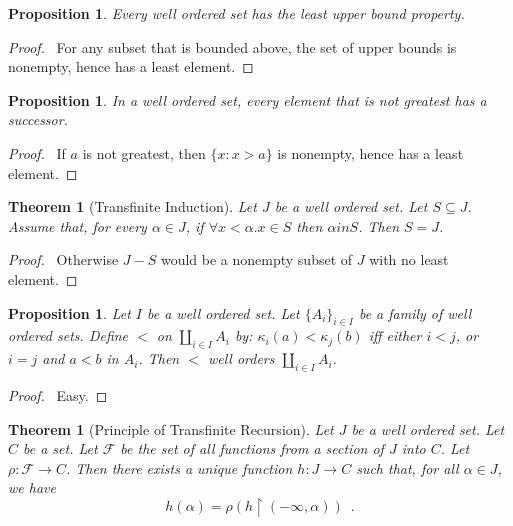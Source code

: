 \documentclass{book}
\let\qed\relax
\newtheorem{prop}[ax]{Proposition}
\newtheorem{thm}[ax]{Theorem}
\theoremstyle{definition}
\begin{document}
\begin{prop}
Every well ordered set has the least upper bound property.
\end{prop}

\begin{proof}
\pf\ For any subset that is bounded above, the set of upper bounds is nonempty, hence has a least element. \qed
\end{proof}

\begin{prop}
In a well ordered set, every element that is not greatest has a successor.
\end{prop}

\begin{proof}
\pf\ If $a$ is not greatest, then $\{ x : x > a \}$ is nonempty, hence has a least element. \qed
\end{proof}

\begin{thm}[Transfinite Induction]
Let $J$ be a well ordered set. Let $S \subseteq J$. Assume that, for every $\alpha \in J$, if $\forall x < \alpha. x \in S$ then $\alpha in S$. Then $S = J$.
\end{thm}

\begin{proof}
\pf\ Otherwise $J - S$ would be a nonempty subset of $J$ with no least element. \qed
\end{proof}

\begin{prop}
Let $I$ be a well ordered set. Let $\{A_i\}_{i \in I}$ be a family of well ordered sets. Define $<$ on $\coprod_{i \in I} A_i$ by: $\kappa_i(a) < \kappa_j(b)$ iff either $i < j$, or $i = j$ and $a < b$ in $A_i$. Then $<$ well orders $\coprod_{i \in I} A_i$.
\end{prop}

\begin{proof}
\pf\ Easy. \qed
\end{proof}

\begin{thm}[Principle of Transfinite Recursion]
Let $J$ be a well ordered set. Let $C$ be a set. Let $\mathcal{F}$ be the set of all functions from a section of $J$ into $C$. Let $\rho : \mathcal{F} \rightarrow C$. Then there exists a unique function $h : J \rightarrow C$ such that, for all $\alpha \in J$, we have
\[ h(\alpha) = \rho(h \restriction (-\infty, \alpha)) \enspace . \]
\end{thm}
\end{document}
